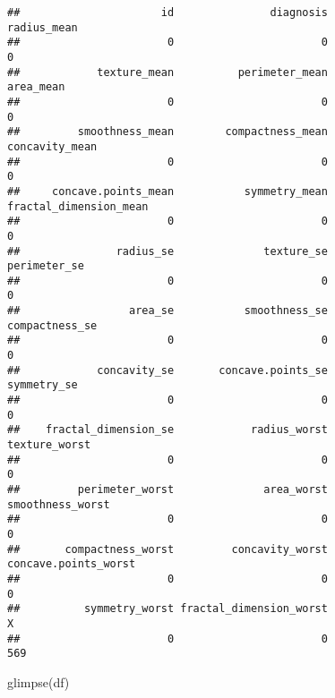 \documentclass[
]{article}
\newenvironment{Shaded}{\begin{snugshade}}{\end{snugshade}}
\newcommand{\FunctionTok}[1]{\textcolor[rgb]{0.00,0.00,0.00}{#1}}
\newcommand{\NormalTok}[1]{#1}
\begin{document}
\begin{verbatim}
##                      id               diagnosis             radius_mean 
##                       0                       0                       0 
##            texture_mean          perimeter_mean               area_mean 
##                       0                       0                       0 
##         smoothness_mean        compactness_mean          concavity_mean 
##                       0                       0                       0 
##     concave.points_mean           symmetry_mean  fractal_dimension_mean 
##                       0                       0                       0 
##               radius_se              texture_se            perimeter_se 
##                       0                       0                       0 
##                 area_se           smoothness_se          compactness_se 
##                       0                       0                       0 
##            concavity_se       concave.points_se             symmetry_se 
##                       0                       0                       0 
##    fractal_dimension_se            radius_worst           texture_worst 
##                       0                       0                       0 
##         perimeter_worst              area_worst        smoothness_worst 
##                       0                       0                       0 
##       compactness_worst         concavity_worst    concave.points_worst 
##                       0                       0                       0 
##          symmetry_worst fractal_dimension_worst                       X 
##                       0                       0                     569
\end{verbatim}

\begin{Shaded}
\begin{Highlighting}[]
\FunctionTok{glimpse}\NormalTok{(df)}
\end{Highlighting}
\end{Shaded}
\end{document}
